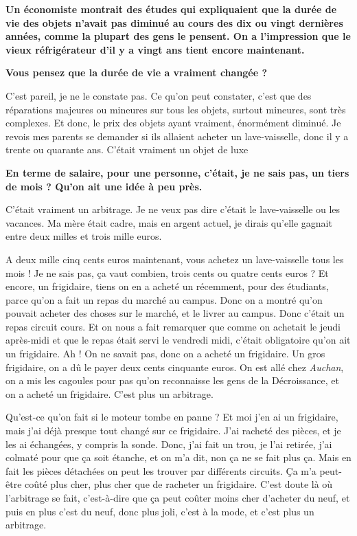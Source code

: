 \begin{small}
\vspace{1\baselineskip}

\textbf{Un économiste montrait des études qui expliquaient que la durée de vie des objets n'avait pas diminué au cours des dix ou vingt dernières années, comme la plupart des gens le pensent. On a l'impression que le vieux réfrigérateur d'il y a vingt ans tient encore maintenant.}

\textbf{Vous pensez que la durée de vie a vraiment changée ?}

\vspace{1\baselineskip}

C'est pareil, je ne le constate pas. Ce qu'on peut constater, c'est que des réparations majeures ou mineures sur tous les objets, surtout mineures, sont très complexes. Et donc, le prix des objets ayant vraiment, énormément diminué. Je revois mes parents se demander si ils allaient acheter un lave-vaisselle, donc il y a trente ou quarante ans. C'était vraiment un objet de luxe

\vspace{1\baselineskip}

\textbf{En terme de salaire, pour une personne, c'était, je ne sais pas, un tiers de mois ? Qu'on ait une idée à peu près.}

\vspace{1\baselineskip}

C'était vraiment un arbitrage. Je ne veux pas dire c'était le lave-vaisselle ou les vacances. Ma mère était cadre, mais en argent actuel, je dirais qu'elle gagnait entre deux milles et trois mille euros. 

A deux mille cinq cents euros maintenant, vous achetez un lave-vaisselle tous les mois ! Je ne sais pas, ça vaut combien, trois cents ou quatre cents euros ? Et encore, un frigidaire, tiens on en a acheté un récemment, pour des étudiants, parce qu’on a fait un repas du marché au campus. Donc on a montré qu'on pouvait acheter des choses sur le marché, et le livrer au campus. Donc c'était un repas circuit cours. Et on nous a fait remarquer que comme on achetait le jeudi après-midi  et que le repas était servi le vendredi midi, c'était obligatoire qu'on ait un frigidaire. Ah ! On ne savait pas, donc on a acheté un frigidaire. Un gros frigidaire, on a dû le payer deux cents cinquante euros. On est allé chez \textit{Auchan}, on a mis les cagoules pour pas qu'on reconnaisse les gens de la Décroissance, et on a acheté un frigidaire. C'est plus un arbitrage. 

\smallbreak
Qu'est-ce qu'on fait si le moteur tombe en panne ? Et moi j'en ai un frigidaire, mais j'ai déjà presque tout changé sur ce frigidaire. J'ai racheté des pièces, et je les ai échangées, y compris la sonde. Donc, j'ai fait un trou, je l'ai retirée, j'ai colmaté pour que ça soit étanche, et on m'a dit, non ça ne se fait plus ça. Mais en fait les pièces détachées on peut les trouver par différents circuits. Ça m'a peut-être coûté plus cher, plus cher que de racheter un frigidaire. C'est doute là où l'arbitrage se fait, c'est-à-dire que ça peut coûter moins cher d'acheter du neuf, et puis en plus c'est du neuf, donc plus joli, c'est à la mode, et c'est plus un arbitrage. 


\end{small}
